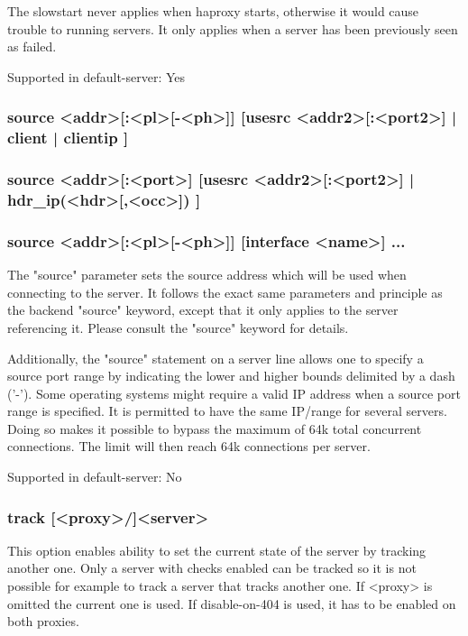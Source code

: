   The slowstart never applies when haproxy starts, otherwise it would cause
  trouble to running servers. It only applies when a server has been previously
  seen as failed.

  Supported in default-server: Yes

\subsubsection[source]{
source <addr>[:<pl>[-<ph>]] [usesrc { <addr2>[:<port2>] | client | clientip } ]
}
\subsubsection*{
source <addr>[:<port>] [usesrc { <addr2>[:<port2>] | hdr\_ip(<hdr>[,<occ>]) } ]
}
\subsubsection*{
source <addr>[:<pl>[-<ph>]] [interface <name>] ...
}

  The "source" parameter sets the source address which will be used when
  connecting to the server. It follows the exact same parameters and principle
  as the backend "source" keyword, except that it only applies to the server
  referencing it. Please consult the "source" keyword for details.

  Additionally, the "source" statement on a server line allows one to specify a
  source port range by indicating the lower and higher bounds delimited by a
  dash ('-'). Some operating systems might require a valid IP address when a
  source port range is specified. It is permitted to have the same IP/range for
  several servers. Doing so makes it possible to bypass the maximum of 64k
  total concurrent connections. The limit will then reach 64k connections per
  server.

  Supported in default-server: No

\subsubsection[track]{track [<proxy>/]<server>}
  This option enables ability to set the current state of the server by
  tracking another one. Only a server with checks enabled can be tracked
  so it is not possible for example to track a server that tracks another
  one. If <proxy> is omitted the current one is used. If disable-on-404 is
  used, it has to be enabled on both proxies.

